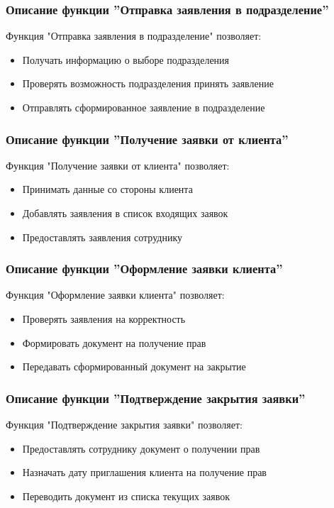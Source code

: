 \documentclass[russian, utf8, 12pt,pointsubsection,floatsubsection]{eskdtext}
\begin{document}
\subsubsection{Описание функции ''Отправка заявления в подразделение''}
Функция "Отправка заявления в подразделение" позволяет:
\begin{itemize}
    \item Получать информацию о выборе подразделения
    \item Проверять возможность подразделения принять заявление
    \item Отправлять сформированное заявление в подразделение
\end{itemize}

\subsubsection{Описание функции ''Получение заявки от клиента''}
Функция "Получение заявки от клиента" позволяет:
\begin{itemize}
    \item Принимать данные со стороны клиента 
    \item Добавлять заявления в список входящих заявок
    \item Предоставлять заявления сотруднику
\end{itemize}


\subsubsection{Описание функции ''Оформление заявки клиента''}
Функция "Оформление заявки клиента" позволяет:
\begin{itemize}
    \item Проверять заявления на корректность
    \item Формировать документ на получение прав
    \item Передавать сформированный документ на закрытие
\end{itemize}

\subsubsection{Описание функции ''Подтверждение закрытия заявки''}
Функция "Подтверждение закрытия заявки" позволяет:
\begin{itemize}
    \item Предоставлять сотруднику документ о получении прав
    \item Назначать дату приглашения клиента на получение прав
    \item Переводить документ из списка текущих заявок
\end{itemize}
\end{document}
